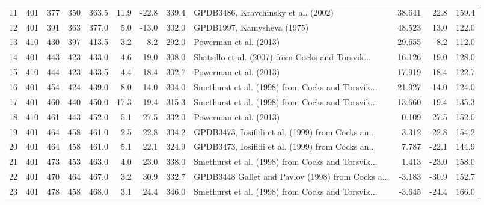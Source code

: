\documentclass[11pt]{article}
\begin{document}
\begin{sidewaystable}
{\begin{tabular}{lrrrrrrrlrrr}
11 &       401 &       377 &      350 &       363.5 &  11.9 & -22.8 &  339.4 &                GPDB3486, Kravchinsky et al. (2002) &    38.641 &    22.8 &   159.4 \\
12 &       401 &       391 &      363 &       377.0 &   5.0 & -13.0 &  302.0 &                         GPDB1997, Kamysheva (1975) &    48.523 &    13.0 &   122.0 \\
13 &       410 &       430 &      397 &       413.5 &   3.2 &   8.2 &  292.0 &                             Powerman et al. (2013) &    29.655 &    -8.2 &   112.0 \\
14 &       401 &       443 &      423 &       433.0 &   4.6 &  19.0 &  308.0 &  Shatsillo et al. (2007) from Cocks and Torsvik... &    16.126 &   -19.0 &   128.0 \\
15 &       410 &       444 &      423 &       433.5 &   4.4 &  18.4 &  302.7 &                             Powerman et al. (2013) &    17.919 &   -18.4 &   122.7 \\
16 &       401 &       454 &      424 &       439.0 &   8.0 &  14.0 &  304.0 &  Smethurst et al. (1998) from Cocks and Torsvik... &    21.927 &   -14.0 &   124.0 \\
17 &       401 &       460 &      440 &       450.0 &  17.3 &  19.4 &  315.3 &  Smethurst et al. (1998) from Cocks and Torsvik... &    13.660 &   -19.4 &   135.3 \\
18 &       410 &       461 &      443 &       452.0 &   5.1 &  27.5 &  332.0 &                             Powerman et al. (2013) &     0.109 &   -27.5 &   152.0 \\
19 &       401 &       464 &      458 &       461.0 &   2.5 &  22.8 &  334.2 &  GPDB3473, Iosifidi et al. (1999) from Cocks an... &     3.312 &   -22.8 &   154.2 \\
20 &       401 &       464 &      458 &       461.0 &   5.1 &  22.1 &  324.9 &  GPDB3473, Iosifidi et al. (1999) from Cocks an... &     7.787 &   -22.1 &   144.9 \\
21 &       401 &       473 &      453 &       463.0 &   4.0 &  23.0 &  338.0 &  Smethurst et al. (1998) from Cocks and Torsvik... &     1.413 &   -23.0 &   158.0 \\
22 &       401 &       470 &      464 &       467.0 &   3.2 &  30.9 &  332.7 &  GPDB3448 Gallet and Pavlov (1998) from Cocks a... &    -3.183 &   -30.9 &   152.7 \\
23 &       401 &       478 &      458 &       468.0 &   3.1 &  24.4 &  346.0 &  Smethurst et al. (1998) from Cocks and Torsvik... &    -3.645 &   -24.4 &   166.0 \\

\end{tabular}}
\end{sidewaystable}
\end{document}
